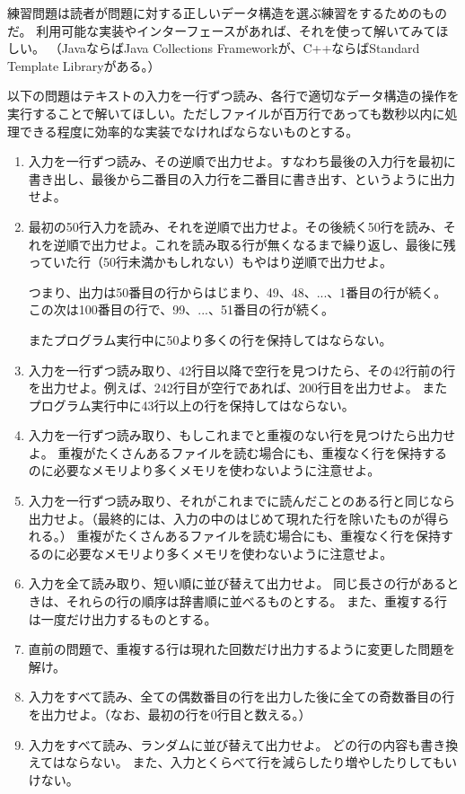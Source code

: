 \begin{exc}
練習問題は読者が問題に対する正しいデータ構造を選ぶ練習をするためのものだ。
利用可能な実装やインターフェースがあれば、それを使って解いてみてほしい。
（JavaならばJava Collections Frameworkが、C++ならばStandard Template Libraryがある。）

以下の問題はテキストの入力を一行ずつ読み、各行で適切なデータ構造の操作を実行することで解いてほしい。ただしファイルが百万行であっても数秒以内に処理できる程度に効率的な実装でなければならないものとする。

  \begin{enumerate}
    \item 入力を一行ずつ読み、その逆順で出力せよ。すなわち最後の入力行を最初に書き出し、最後から二番目の入力行を二番目に書き出す、というように出力せよ。

    \item  最初の50行入力を読み、それを逆順で出力せよ。その後続く50行を読み、それを逆順で出力せよ。これを読み取る行が無くなるまで繰り返し、最後に残っていた行（50行未満かもしれない）もやはり逆順で出力せよ。

      つまり、出力は50番目の行からはじまり、49、48、...、1番目の行が続く。
	  この次は100番目の行で、99、...、51番目の行が続く。

	 またプログラム実行中に50より多くの行を保持してはならない。

    \item 入力を一行ずつ読み取り、42行目以降で空行を見つけたら、その42行前の行を出力せよ。例えば、242行目が空行であれば、200行目を出力せよ。
	またプログラム実行中に43行以上の行を保持してはならない。

    \item 入力を一行ずつ読み取り、もしこれまでと重複のない行を見つけたら出力せよ。
	重複がたくさんあるファイルを読む場合にも、重複なく行を保持するのに必要なメモリより多くメモリを使わないように注意せよ。

    \item 入力を一行ずつ読み取り、それがこれまでに読んだことのある行と同じなら出力せよ。（最終的には、入力の中のはじめて現れた行を除いたものが得られる。）
	重複がたくさんあるファイルを読む場合にも、重複なく行を保持するのに必要なメモリより多くメモリを使わないように注意せよ。

    \item 入力を全て読み取り、短い順に並び替えて出力せよ。
	同じ長さの行があるときは、それらの行の順序は辞書順に並べるものとする。
	また、重複する行は一度だけ出力するものとする。

    \item 直前の問題で、重複する行は現れた回数だけ出力するように変更した問題を解け。

    \item 入力をすべて読み、全ての偶数番目の行を出力した後に全ての奇数番目の行を出力せよ。（なお、最初の行を0行目と数える。）

    \item 入力をすべて読み、ランダムに並び替えて出力せよ。
	どの行の内容も書き換えてはならない。
	また、入力とくらべて行を減らしたり増やしたりしてもいけない。
  \end{enumerate}
\end{exc}

